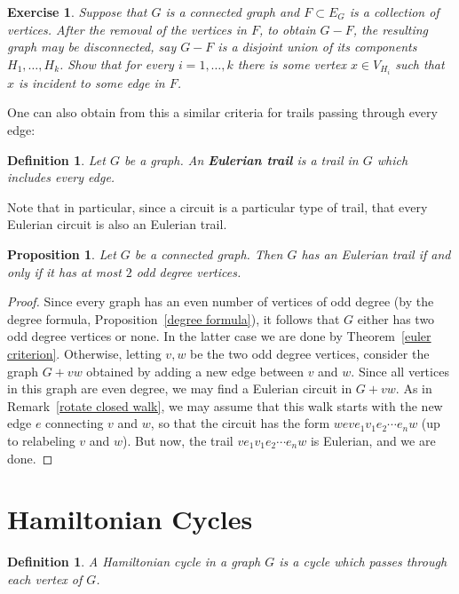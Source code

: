 \documentclass[12pt]{report}
\theoremstyle{plain}
\newtheorem{defn}[thm]{Definition}
\newtheorem{prop}[thm]{Proposition}
\newtheorem{exercise}{Exercise}[section]
\begin{document}
\begin{exercise} \label{ex: disconnect touching}
Suppose that $G$ is a connected graph and $F \subset E_G$ is a collection of
vertices. After the removal of the vertices in $F$, to obtain $G - F$, the
resulting graph may be disconnected, say $G - F$ is a disjoint union of its
components $H_1, \ldots, H_k$. Show that for every $i = 1, \ldots, k$ there
is some vertex $x \in V_{H_i}$ such that $x$ is incident to some edge in
$F$.
\end{exercise}

One can also obtain from this a similar criteria for trails passing through
every edge:

\begin{defn}
Let $G$ be a graph. An \textbf{Eulerian trail} is
a trail in $G$ which includes every edge.
\end{defn}
Note that in particular, since a circuit is a particular type of trail,
that every Eulerian circuit is also an Eulerian trail.

\begin{prop}
Let $G$ be a connected graph. Then $G$ has an Eulerian trail if and only if
it has at most $2$ odd degree vertices.
\end{prop}
\begin{proof}
Since every graph has an even number of vertices of odd degree (by the
degree formula, Proposition~\ref{degree formula}), it follows that $G$
either has two odd degree vertices or none. In the latter case we are done
by Theorem~\ref{euler criterion}. Otherwise, letting $v, w$ be the two odd
degree vertices, consider the graph $G + vw$ obtained by adding a new edge
between $v$ and $w$. Since all vertices in this graph are even degree, we
may find a Eulerian circuit in $G + vw$. As in Remark~\ref{rotate closed
walk}, we may assume that this walk starts with the new edge $e$ connecting
$v$ and $w$, so that the circuit has the form $weve_1v_1e_2 \cdots e_n w$ (up
to relabeling $v$ and $w$). But now, the trail $v e_1 v_1 e_2 \cdots e_n w$
is Eulerian, and we are done.
\end{proof}

\section{Hamiltonian Cycles}

\begin{defn} 
A Hamiltonian cycle in a graph $G$ is a cycle which passes through each
vertex of $G$.
\end{defn}
\end{document}
